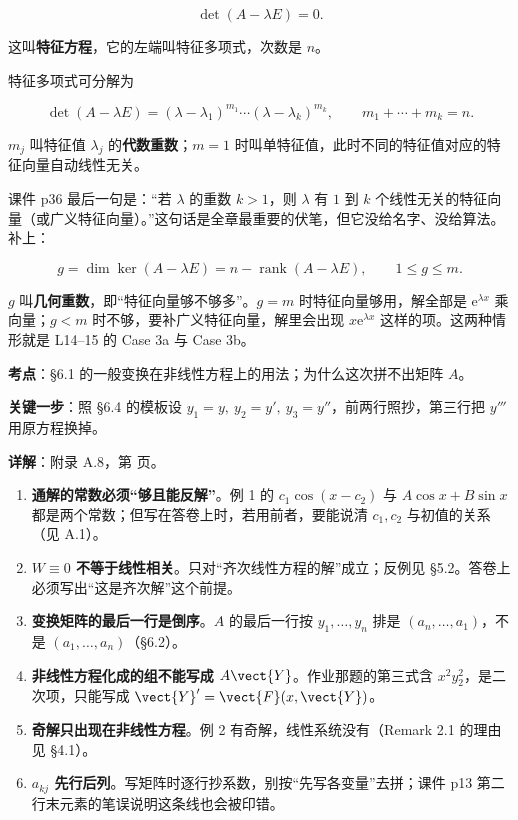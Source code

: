 \documentclass[11pt]{ctexart}
\renewcommand{\qbreak}{\needspace{0.26\textheight}}
\newcommand{\rank}{\operatorname{rank}}
\begin{document}
\[
\det(A-\lambda E)=0 .
\]

这叫\textbf{特征方程}，它的左端叫特征多项式，次数是 $n$。


特征多项式可分解为

\[
\det(A-\lambda E)=(\lambda-\lambda_1)^{m_1}\cdots(\lambda-\lambda_k)^{m_k},
\qquad m_1+\cdots+m_k=n .
\]

$m_j$ 叫特征值 $\lambda_j$ 的\textbf{代数重数}；$m=1$ 时叫单特征值，此时不同的特征值对应的特征向量自动线性无关。

课件 p36 最后一句是：“若 $\lambda$ 的重数 $k>1$，则 $\lambda$ 有 $1$ 到 $k$ 个线性无关的特征向量（或广义特征向量）。”这句话是全章最重要的伏笔，但它没给名字、没给算法。补上：

\[
g=\dim\ker(A-\lambda E)=n-\rank(A-\lambda E),\qquad 1\le g\le m .
\]

$g$ 叫\textbf{几何重数}，即“特征向量够不够多”。$g=m$ 时特征向量够用，解全部是 $\mathrm{e}^{\lambda x}$ 乘向量；$g<m$ 时不够，要补广义特征向量，解里会出现 $x\mathrm{e}^{\lambda x}$ 这样的项。这两种情形就是 L14--15 的 Case 3a 与 Case 3b。


\qbreak
{}
\par\textbf{考点}：§6.1 的一般变换在非线性方程上的用法；为什么这次拼不出矩阵 $A$。
\par\textbf{关键一步}：照 §6.4 的模板设 $y_1=y,\ y_2=y',\ y_3=y''$，前两行照抄，第三行把 $y'''$ 用原方程换掉。
\par\textbf{详解}：附录 A.8，第 \pageref{c1:app:a8} 页。


\begin{enumerate}
  \item \textbf{通解的常数必须“够且能反解”}。例 1 的 $c_1\cos(x-c_2)$ 与 $A\cos x+B\sin x$ 都是两个常数；但写在答卷上时，若用前者，要能说清 $c_1,c_2$ 与初值的关系（见 A.1）。
  \item \textbf{$W\equiv0$ 不等于线性相关}。只对“齐次线性方程的解”成立；反例见 §5.2。答卷上必须写出“这是齐次解”这个前提。
  \item \textbf{变换矩阵的最后一行是倒序}。$A$ 的最后一行按 $y_1,\dots,y_n$ 排是 $(a_n,\dots,a_1)$，不是 $(a_1,\dots,a_n)$（§6.2）。
  \item \textbf{非线性方程化成的组不能写成 $A\vect{Y}$}。作业那题的第三式含 $x^2y_2^2$，是二次项，只能写成 $\vect{Y}'=\vect{F}(x,\vect{Y})$。
  \item \textbf{奇解只出现在非线性方程}。例 2 有奇解，线性系统没有（Remark 2.1 的理由见 §4.1）。
  \item \textbf{$a_{kj}$ 先行后列}。写矩阵时逐行抄系数，别按“先写各变量”去拼；课件 p13 第二行末元素的笔误说明这条线也会被印错。
\end{enumerate}
\end{document}
